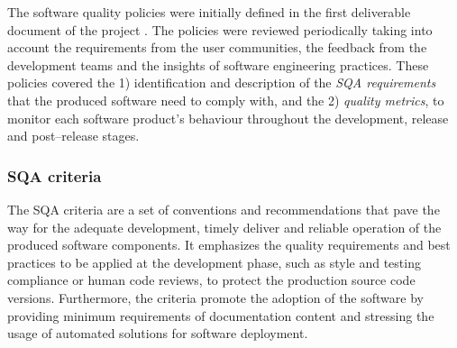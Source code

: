 \documentclass[journal]{IEEEtran}
\begin{document}
The software quality policies were initially defined in the first deliverable document of the
project \cite{indigo-d31}. The policies were reviewed periodically taking into account the requirements
from the user communities, the feedback from the development teams and the insights of software
engineering practices. These policies covered the 1) identification
and description of the \emph{SQA requirements} that the produced software need
to comply with, and the 2) \emph{quality metrics}, to monitor each software product's
behaviour throughout the development, release and post--release stages.

\subsubsection{SQA criteria}

The SQA criteria are a set of conventions and recommendations that pave the way for
the adequate development, timely deliver and reliable operation of the produced software components.
It emphasizes the quality requirements and best practices to be applied at the
development phase, such as style and testing compliance or human code reviews, to protect the
production source code versions. Furthermore, the criteria promote the adoption of the software
by providing minimum requirements of documentation content and stressing the usage of automated
solutions for software deployment.
\end{document}
